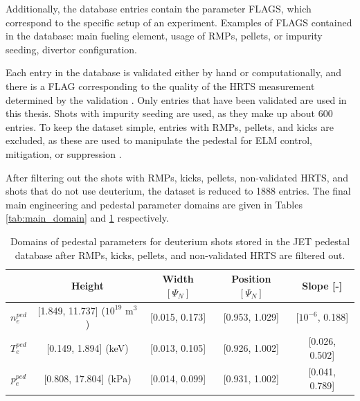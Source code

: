 \documentclass[a4paper, twoside, final, 12pt]{article}
\begin{document}
Additionally, the database entries contain the parameter FLAGS, which correspond to the specific setup of an experiment.
Examples of FLAGS contained in the database: main fueling element, usage of RMPs, pellets, or impurity seeding, divertor configuration. 

Each entry in the database is validated either by hand or computationally, and there is a FLAG corresponding to the quality of the HRTS measurement determined by the validation \cite{Frassinetti_2020}.
Only entries that have been validated are used in this thesis.
Shots with impurity seeding are used, as they make up about 600 entries.
To keep the dataset simple, entries with RMPs, pellets, and kicks are excluded, as these are used to manipulate the pedestal for ELM control, mitigation, or suppression \cite{Viezzer_2018}.

After filtering out the shots with RMPs, kicks, pellets, non-validated HRTS, and shots that do not use deuterium, the dataset is reduced to 1888 entries. The final main engineering and pedestal parameter domains are given in Tables \ref{tab:main_domain} and \ref{tab:ped_quant} respectively.
\begin{center}
\begin{table}[h!]
\begin{tabular}{ | c | c | c | c | c | }
	\hline 
	& Height & Width $[\Psi_N]$ & Position $[\Psi_N]$ & Slope [-] \\ 
	\hline
	$n_e^{ped}$ &[1.849, 11.737] ($10^{19}$ m$^3$) & [0.015, 0.173]& [0.953, 1.029] & [$10^{-6}$, 0.188] \\
	$T_e^{ped}$ & [0.149, 1.894] (keV)& [0.013, 0.105] & [0.926, 1.002] & [0.026, 0.502] \\
	$p_e^{ped}$ & [0.808, 17.804] (kPa)& [0.014, 0.099] & [0.931, 1.002]& [0.041, 0.789] \\
	\hline
\end{tabular}
\caption{Domains of pedestal parameters for deuterium shots stored in the JET pedestal database after RMPs, kicks, pellets, and non-validated HRTS are filtered out.}
\label{tab:ped_quant}
\end{table}
\end{center}
\end{document}
